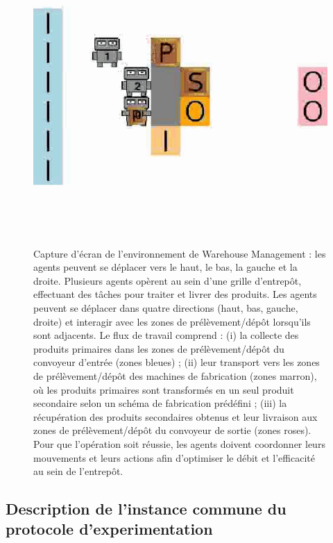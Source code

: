 \begin{figure}[h!]
    \centering
    \includegraphics[trim=0cm 3cm 0cm 3cm, clip, width=0.9\linewidth]{figures/wm.png}
    \caption[Capture d'écran de l'environnement de Warehouse Management]{Capture d'écran de l'environnement de Warehouse Management : les agents peuvent se déplacer vers le haut, le bas, la gauche et la droite. Plusieurs agents opèrent au sein d'une grille d'entrepôt, effectuant des tâches pour traiter et livrer des produits. Les agents peuvent se déplacer dans quatre directions (haut, bas, gauche, droite) et interagir avec les zones de prélèvement/dépôt lorsqu'ils sont adjacents. Le flux de travail comprend : (i) la collecte des produits primaires dans les zones de prélèvement/dépôt du convoyeur d'entrée (zones bleues) ; (ii) leur transport vers les zones de prélèvement/dépôt des machines de fabrication (zones marron), où les produits primaires sont transformés en un seul produit secondaire selon un schéma de fabrication prédéfini ; (iii) la récupération des produits secondaires obtenus et leur livraison aux zones de prélèvement/dépôt du convoyeur de sortie (zones roses). Pour que l'opération soit réussie, les agents doivent coordonner leurs mouvements et leurs actions afin d'optimiser le débit et l'efficacité au sein de l'entrepôt.}
    \label{fig:warehouse}
\end{figure}


\subsection{Description de l'instance commune du protocole d'experimentation}

